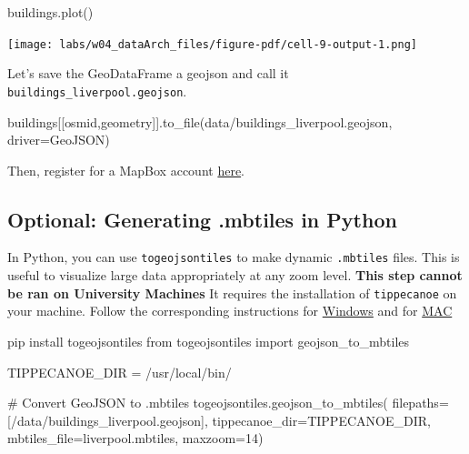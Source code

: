 \documentclass[
  letterpaper,
  DIV=11,
  numbers=noendperiod]{scrreprt}
\newenvironment{Shaded}{\begin{snugshade}}{\end{snugshade}}
\newcommand{\CommentTok}[1]{\textcolor[rgb]{0.37,0.37,0.37}{#1}}
\newcommand{\DecValTok}[1]{\textcolor[rgb]{0.68,0.00,0.00}{#1}}
\newcommand{\ImportTok}[1]{\textcolor[rgb]{0.00,0.46,0.62}{#1}}
\newcommand{\NormalTok}[1]{\textcolor[rgb]{0.00,0.23,0.31}{#1}}
\newcommand{\OperatorTok}[1]{\textcolor[rgb]{0.37,0.37,0.37}{#1}}
\newcommand{\StringTok}[1]{\textcolor[rgb]{0.13,0.47,0.30}{#1}}
\begin{document}
\begin{Shaded}
\begin{Highlighting}[]
\NormalTok{buildings.plot()}
\end{Highlighting}
\end{Shaded}

\texttt{[image: labs/w04\_dataArch\_files/figure-pdf/cell-9-output-1.png]}

Let's save the GeoDataFrame a geojson and call it
\texttt{buildings\_liverpool.geojson}.

\begin{Shaded}
\begin{Highlighting}[]
\NormalTok{buildings[[}\StringTok{\textquotesingle{}osmid\textquotesingle{}}\NormalTok{,}\StringTok{\textquotesingle{}geometry\textquotesingle{}}\NormalTok{]].to\_file(}\StringTok{\textquotesingle{}data/buildings\_liverpool.geojson\textquotesingle{}}\NormalTok{,  driver}\OperatorTok{=}\StringTok{\textquotesingle{}GeoJSON\textquotesingle{}}\NormalTok{)}
\end{Highlighting}
\end{Shaded}

Then, register for a MapBox account
\href{https://account.mapbox.com/auth/signup/?route-to=\%22https\%3A\%2F\%2Faccount.mapbox.com\%2Faccess-tokens\%2F\%22}{here}.

\subsection{Optional: Generating .mbtiles in
Python}\label{optional-generating-.mbtiles-in-python}

In Python, you can use \texttt{togeojsontiles} to make dynamic
\texttt{.mbtiles} files. This is useful to visualize large data
appropriately at any zoom level. \textbf{This step cannot be ran on
University Machines} It requires the installation of \texttt{tippecanoe}
on your machine. Follow the corresponding instructions for
\href{https://gist.github.com/ryanbaumann/e5c7d76f6eeb8598e66c5785b677726e}{Windows}
and for \href{https://github.com/mapbox/tippecanoe}{MAC}

\begin{Shaded}
\begin{Highlighting}[]
\NormalTok{pip install togeojsontiles}
\ImportTok{from}\NormalTok{ togeojsontiles }\ImportTok{import}\NormalTok{ geojson\_to\_mbtiles}

\NormalTok{TIPPECANOE\_DIR }\OperatorTok{=} \StringTok{\textquotesingle{}/usr/local/bin/\textquotesingle{}}

\CommentTok{\# Convert GeoJSON to .mbtiles}
\NormalTok{togeojsontiles.geojson\_to\_mbtiles(}
\NormalTok{    filepaths}\OperatorTok{=}\NormalTok{[}\StringTok{\textquotesingle{}/data/buildings\_liverpool.geojson\textquotesingle{}}\NormalTok{],}
\NormalTok{    tippecanoe\_dir}\OperatorTok{=}\NormalTok{TIPPECANOE\_DIR,}
\NormalTok{    mbtiles\_file}\OperatorTok{=}\StringTok{\textquotesingle{}liverpool.mbtiles\textquotesingle{}}\NormalTok{,}
\NormalTok{    maxzoom}\OperatorTok{=}\DecValTok{14}\NormalTok{)}
\end{Highlighting}
\end{Shaded}
\end{document}
